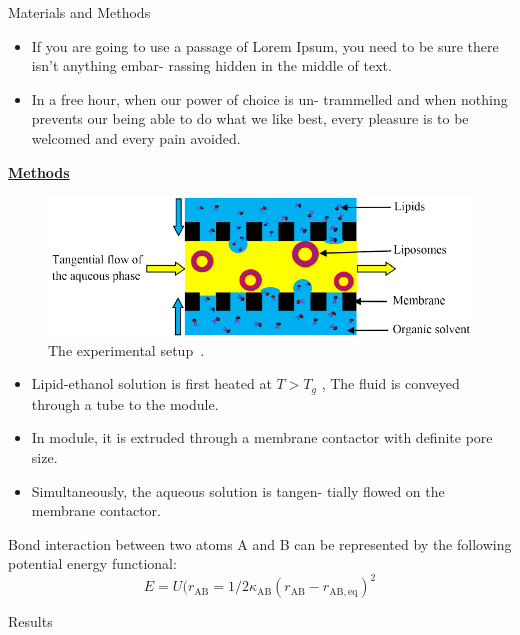 \documentclass[20pt]{beamer}
\begin{document}
\begin{frame}[t]
\begin{columns}[t]
\begin{column}{0.32\linewidth}
\begin{block}{Materials and Methods}
\begin{itemize}
	\item If you are going to use a passage of Lorem Ipsum,
	you need to be sure there isn’t anything embar-
	rassing hidden in the middle of text.
	
	\item In a free hour, when our power of choice is un-
	trammelled and when nothing prevents our being
	able to do what we like best, every pleasure is to
	be welcomed and every pain avoided.
\end{itemize}	

\textbf{\underline{Methods}}

\vspace{1cm}

\begin{figure} 	 
	\includegraphics[width=0.95\linewidth]{setup}
	\caption{The experimental setup~\cite{jaafar2011new}.}	
\end{figure}

\begin{itemize}
	\item Lipid-ethanol solution is first heated at $T>T_g$ ,
	The fluid is conveyed through a tube to the module.
	
	\item In module, it is extruded through a membrane
	contactor with definite pore size.
	
	\item Simultaneously, the aqueous solution is tangen-
	tially flowed on the membrane contactor.
\end{itemize}

\vspace{1cm}

Bond interaction between two atoms A and B can be represented by the following potential energy functional:
\begin{equation*}
E=U(r_\mathrm{AB}= 1/2\kappa_\mathrm{AB}(r_\mathrm{AB}-r_\mathrm{AB,eq})^2
\end{equation*}
	\end{block}	
	
\begin{block}{Results}
\vspace{1cm}
	

\end{block}
\end{column}
\end{columns}
\end{frame}
\end{document}
